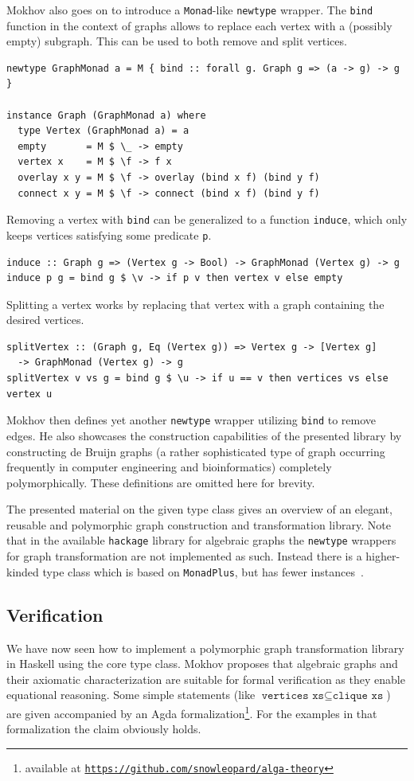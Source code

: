 \documentclass{article}
\newcommand{\hs}{\texttt}
\begin{document}
Mokhov also goes on to introduce a \hs{Monad}-like \hs{newtype} wrapper. The
\hs{bind} function in the context of graphs allows to replace each vertex with a
(possibly empty) subgraph. This can be used to both remove and split vertices.
\begin{verbatim}
newtype GraphMonad a = M { bind :: forall g. Graph g => (a -> g) -> g }

instance Graph (GraphMonad a) where
  type Vertex (GraphMonad a) = a
  empty       = M $ \_ -> empty
  vertex x    = M $ \f -> f x
  overlay x y = M $ \f -> overlay (bind x f) (bind y f)
  connect x y = M $ \f -> connect (bind x f) (bind y f)
\end{verbatim}
Removing a vertex with \hs{bind} can be generalized to a function \hs{induce},
which only keeps vertices satisfying some predicate \hs{p}.
\begin{verbatim}
induce :: Graph g => (Vertex g -> Bool) -> GraphMonad (Vertex g) -> g
induce p g = bind g $ \v -> if p v then vertex v else empty
\end{verbatim}
Splitting a vertex works by replacing that vertex with a graph containing the
desired vertices.
\begin{verbatim}
splitVertex :: (Graph g, Eq (Vertex g)) => Vertex g -> [Vertex g] 
  -> GraphMonad (Vertex g) -> g
splitVertex v vs g = bind g $ \u -> if u == v then vertices vs else vertex u
\end{verbatim}
Mokhov then defines yet another \hs{newtype} wrapper utilizing \hs{bind} to
remove edges. He also showcases the construction capabilities of the presented
library by constructing de Bruijn graphs (a rather sophisticated type of graph
occurring frequently in computer engineering and bioinformatics)
completely polymorphically. These definitions are omitted here for brevity.

The presented material on the given type class gives an overview of an elegant,
reusable and polymorphic graph construction and transformation library. Note
that in the available \texttt{hackage} library for algebraic graphs the
\hs{newtype} wrappers for graph transformation are not implemented as such.
Instead there is a higher-kinded type class which is based
on \hs{MonadPlus}, but has fewer instances~\cite{mokhov2017algebraic}.

\subsection{Verification}\label{sec:verification}
We have now seen how to implement a polymorphic graph transformation library in
Haskell using the core type class. Mokhov proposes that algebraic graphs and
their axiomatic characterization are suitable for formal verification as they
enable equational reasoning. Some
simple statements (like $\hs{vertices xs} \subseteq \hs{clique xs}$) are given
accompanied by an Agda formalization\footnote{available at
  \texttt{\href{https://github.com/snowleopard/alga-theory}{https://github.com/snowleopard/alga-theory}}}.
For the examples in that formalization the claim obviously holds.
\end{document}

